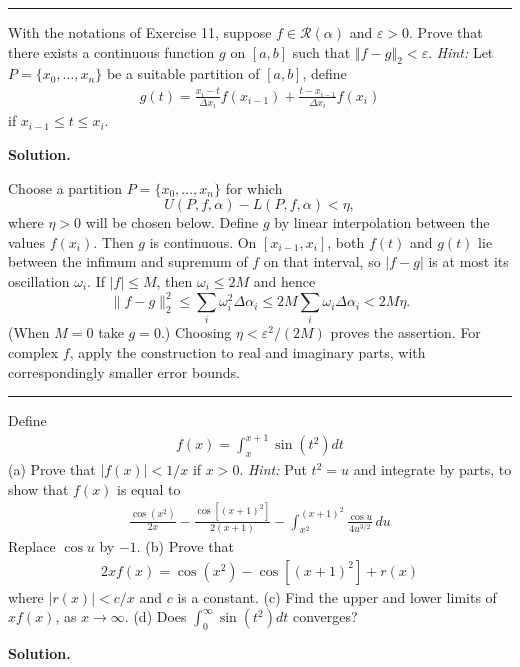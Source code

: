 \documentclass[12pt]{article}
\theoremstyle{definition}
\begin{document}
\bigskip\noindent\hrule\bigskip

With the notations of Exercise 11, suppose $f\in\mathcal{R}(\alpha)$ and $\varepsilon>0$. Prove that there exists a continuous function $g$ on $[a,b]$ such that $\left\Vert f-g\right\Vert_2<\varepsilon$.
\textit{Hint:} Let $P=\{x_0,\ldots,x_n\}$ be a suitable partition of $[a,b]$, define
\begin{align*}
g(t)=\frac{x_i-t}{\Delta x_i}f(x_{i-1})+\frac{t-x_{i-1}}{\Delta x_i}f(x_i)
\end{align*}
if $x_{i-1}\le t\le x_i$.

\smallskip
\noindent\textbf{Solution.}\quad


Choose a partition $P=\{x_0,\ldots,x_n\}$ for which
\[
 U(P,f,\alpha)-L(P,f,\alpha)<\eta,
\]
where $\eta>0$ will be chosen below.  Define $g$ by linear interpolation between the values $f(x_i)$.  Then $g$ is continuous.  On $[x_{i-1},x_i]$, both $f(t)$ and $g(t)$ lie between the infimum and supremum of $f$ on that interval, so $|f-g|$ is at most its oscillation $\omega_i$.  If $|f|\le M$, then $\omega_i\le2M$ and hence
\[
 \|f-g\|_2^2\le\sum_i\omega_i^2\Delta\alpha_i
 \le 2M\sum_i\omega_i\Delta\alpha_i<2M\eta.
\]
(When $M=0$ take $g=0$.)  Choosing $\eta<\varepsilon^2/(2M)$ proves the assertion.  For complex $f$, apply the construction to real and imaginary parts, with correspondingly smaller error bounds.




\bigskip\noindent\hrule\bigskip

Define
\begin{align*}
f(x)=\int_x^{x+1}\sin\left(t^2\right)dt
\end{align*}
(a) Prove that $\left\vert f(x)\right\vert<1/x$ if $x>0$.
\textit{Hint:} Put $t^2=u$ and integrate by parts, to show that $f(x)$ is equal to
\begin{align*}
\frac{\cos\left(x^2\right)}{2x}-\frac{\cos\left[(x+1)^2\right]}{2(x+1)}-\int_{x^2}^{(x+1)^2}\frac{\cos u}{4u^{3/2}}\,du
\end{align*}
Replace $\cos u$ by $-1$.
(b) Prove that
\begin{align*}
2xf(x)=\cos\left(x^2\right)-\cos\left[(x+1)^2\right]+r(x)
\end{align*}
where $\left\vert r(x)\right\vert<c/x$ and $c$ is a constant.
(c) Find the upper and lower limits of $xf(x)$, as $x\to\infty$.
(d) Does $\int_0^\infty\sin\left(t^2\right)dt$ converges?

\smallskip
\noindent\textbf{Solution.}\quad
\end{document}
